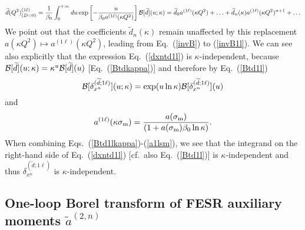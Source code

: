 \documentclass[aps,nofootinbib,showkeys,noshowpacs,preprintnumbers,amsmath,amssymb]{revtex4}
\def\be{\begin{equation}}
\def\ee{\end{equation}}
\newcommand{\sm}{{\sigma_{\rm m}}}
\newcommand{\ta}{{\widetilde a}}
\newcommand{\td}{{\widetilde d}}
\begin{document}
\be
\td(Q^2)^{(1 \ell)}_{(D=0)}=\frac{1}{\beta_0} \int_{0}^{+\infty} du \exp \left[- \frac{u}{\beta_0 a^{(1 \ell)}(\kappa Q^2)} \right] {\cal B}[\td](u;\kappa) = {\td}_0 a^{(1 \ell)}(\kappa Q^2)  + \ldots + {\td}_n(\kappa)  a^{(1 \ell)}(\kappa Q^2)^{n+1} + \ldots
\label{invB1l} \ee
We point out that the coefficients ${\td}_n(\kappa)$ remain unaffected by this replacement $a(\kappa Q^2) \mapsto a^{(1 \ell)}(\kappa Q^2)$, leading from Eq.~(\ref{invB}) to (\ref{invB1l}).
We can see also explicitly that the expression Eq.~(\ref{dxntd1l}) is $\kappa$-independent, because ${\cal B}[{\td}](u; \kappa) = \kappa^u {\cal B}[{\td}](u)$ [Eq.~(\ref{Btdkappa})] and therefore by Eq.~(\ref{Btd1l})
\be
{\cal B}[ \delta_{x^n}^{(\td; 1 \ell)}](u; \kappa) = \exp( u \ln \kappa) {\cal B}[ \delta_{x^n}^{(\td; 1 \ell)}](u)
\label{Btd1lkappa} \ee
and
\be
a^{(1 \ell)}(\kappa \sm) = \frac{ a(\sm) }{(1 + a(\sm) \beta_0 \ln \kappa)}.
\label{a1lsm} \ee
When combining Eqs.~(\ref{Btd1lkappa})-(\ref{a1lsm}), we see that the integrand on the right-hand side of Eq.~(\ref{dxntd1l}) [cf.~also Eq.~(\ref{Btd1l})] is $\kappa$-independent and thus $\delta_{x^n}^{(\td; 1 \ell)}$ is $\kappa$-independent.

\subsection{One-loop Borel transform of FESR auxiliary moments $\ta^{(2,n)}$}
\label{app:ta2n}
\end{document}
